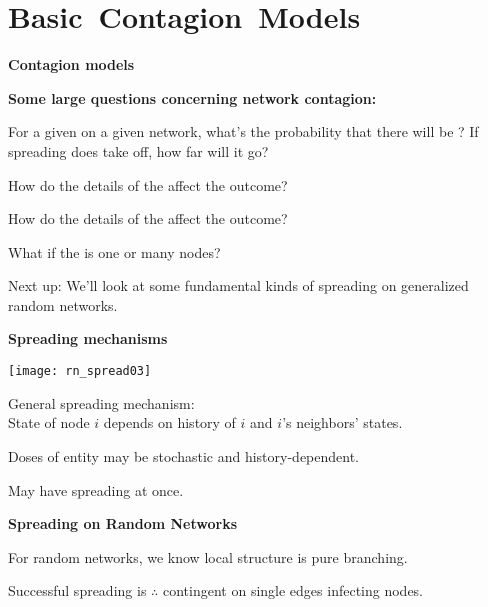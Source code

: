 
\section{Basic\ Contagion\ Models}

  \textbf{Contagion models}

  \textbf{Some large questions concerning network contagion:}
    
     
      For a given 
      on a given network,
      what's the \alert{probability}
      that there will be ?
     If spreading does take off, how far will it go?
     
      How do the \alert{details} of the 
      affect the outcome?
     
      How do the \alert{details} of the 
      affect the outcome?
     
      What if the  is one or many nodes?
    
  

  
   
    \alert{Next up}: We'll look at some fundamental
    kinds of spreading on generalized random networks.
  


  \textbf{Spreading mechanisms}

      
    \texttt{[image: rn\_spread03]}
    
    
    
      \alert{General spreading mechanism}:\\
      State of node $i$ depends on
      history of $i$ and $i$'s neighbors' states.
     
      \alert{Doses} of entity may be stochastic and history-dependent.
     
      May have  spreading at once.
    
  

  \textbf{Spreading on Random Networks}

  
   
    For random networks, we know local structure is pure branching.
   
    Successful spreading is $\therefore$ contingent on 
    \alert{single edges} infecting nodes.
              
        
                  

